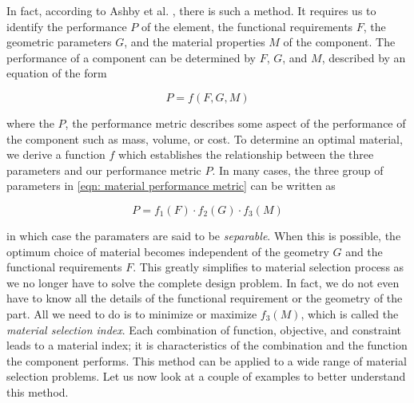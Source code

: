 \documentclass[
10pt,
a4paper,
openany,
svgnames,
]{book}
\begin{document}
In fact, according to Ashby et al. \cite{ashby2010materials}, there is such a method. It requires us to identify the performance $P$ of the element, the functional requirements $F$, the geometric parameters $G$, and the material properties $M$ of the component. The performance of a component can be determined by $F$, $G$, and $M$, described by an equation of the form

\begin{equation}
  \label{eqn: material performance metric}
  P = f \left(F, G, M \right)
\end{equation}

where the $P$, the performance metric describes some aspect of the performance of the component such as mass, volume, or cost. To determine an optimal material, we derive a function $f$ which establishes the relationship between the three parameters and our performance metric $P$. In many cases, the three group of parameters in \cref{eqn: material performance metric} can be written as

\begin{equation}
  \label{eq: separable mat perf metric}
  P = f_1(F) \cdot f_2(G) \cdot f_3(M)
\end{equation}

in which case the paramaters are said to be \emph{separable}. When this is possible, the optimum choice of material becomes independent of the geometry $G$ and the functional requirements $F$. This greatly simplifies to material selection process as we no longer have to solve the complete design problem. In fact, we do not even have to know all the details of the functional requirement or the geometry of the part. All we need to do is to minimize or maximize $f_3(M)$, which is called the \emph{material selection index}. Each combination of function, objective, and constraint leads to a material index; it is characteristics of the combination and the function the component performs. This method can be applied to a wide range of material selection problems. Let us now look at a couple of examples to better understand this method.
\end{document}
